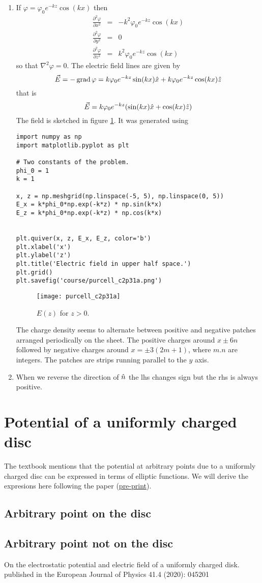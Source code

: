 \documentclass{article}
\begin{document}
\begin{enumerate}
\item If $\varphi = \varphi_0 e^{-kz}\cos(kx)$ then
\begin{eqnarray*}
\frac{\partial^2\varphi}{\partial x^2} &=& -k^2\varphi_0 e^{-kz}\cos(kx) \\
\frac{\partial^2\varphi}{\partial y^2} &=& 0 \\
\frac{\partial^2\varphi}{\partial z^2} &=& k^2\varphi_0 e^{-kz}\cos(kx)
\end{eqnarray*}
so that $\nabla^2\varphi = 0$. The electric field lines are given by
\[
\vec{E} = -\operatorname{grad}\varphi = k\varphi_0 e^{-kz}\sin(kx)\hat{x} + 
k\varphi_0 e^{-kz}\cos(kx)\hat{z}
\]
that is
\[
\vec{E} = k\varphi_0 e^{-kz}(\sin(kx)\hat{x} + \cos(kx)\hat{z})
\]
The field is sketched in figure \ref{c2f31}. It was generated using
\begin{verbatim}
import numpy as np
import matplotlib.pyplot as plt

# Two constants of the problem.
phi_0 = 1
k = 1

x, z = np.meshgrid(np.linspace(-5, 5), np.linspace(0, 5))
E_x = k*phi_0*np.exp(-k*z) * np.sin(k*x)
E_z = k*phi_0*np.exp(-k*z) * np.cos(k*x)


plt.quiver(x, z, E_x, E_z, color='b')
plt.xlabel('x')
plt.ylabel('z')
plt.title('Electric field in upper half space.')
plt.grid()
plt.savefig('course/purcell_c2p31a.png')
\end{verbatim}
\begin{figure}[!ht]
\center
\texttt{[image: purcell\_c2p31a]}
\caption{$E(z)$ for $z > 0$.}
\label{c2f31}
\end{figure}
The charge density seems to alternate between positive and negative patches 
arranged periodically on the sheet. The positive charges around $x \pm 6n$ 
followed by negative charges around $x = \pm 3(2m + 1)$, where $m. n$ are
integers. The patches are strips running parallel to the $y$ axis.

\item When we reverse the direction of $\hat{n}$ the lhs changes sign but the rhs
is always positive.
\end{enumerate}

\section{Potential of a uniformly charged disc}
The textbook mentions that the potential at arbitrary points due to a uniformly
charged disc can be expressed in terms of elliptic functions. We will derive the
expresions here following the paper (\href{https://arxiv.org/pdf/2004.04540}{pre-print})\cite{bs}.
\subsection{Arbitrary point on the disc}
\subsection{Arbitrary point not on the disc}

\begin{thebibliography}{1}
 On the electrostatic potential and electric field of a uniformly charged disk.
published in the European Journal of Physics 41.4 (2020): 045201
\end{thebibliography}
\end{document}
